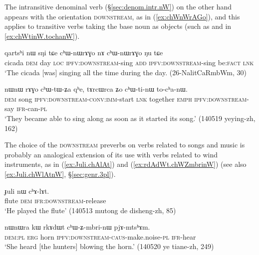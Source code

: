 The intransitive denominal verb  (§\ref{sec:denom.intr.nW}) on the other hand appears with the orientation \textsc{downstream}, as in (\ref{ex:chWnWrAGo}), and this applies to transitive verbs taking the base noun  as objects (such as  and   in \ref{ex:chWtinW.tochanW}).

\begin{exe}
\ex \label{ex:chWnWrAGo}
\gll qartsʰi nɯ sŋi tɕe cʰɯ-nɯrɤɣo nɤ cʰɯ-nɯrɤɣo ŋu tɕe   \\
cicada \textsc{dem} day \textsc{loc} \textsc{ipfv}:\textsc{downstream}-sing \textsc{add} \textsc{ipfv}:\textsc{downstream}-sing be:\textsc{fact} \textsc{lnk} \\
\glt `The cicada [was] singing all the time during the day. (26-NalitCaRmbWm, 30)
\end{exe} 

\begin{exe}
\ex \label{ex:chWtinW.tochanW}
\gll  nɯnɯ rɤɣo cʰɯ-tɯ-ʑa qʰe, tɤrcɯrca ʑo cʰɯ-ti-nɯ to-cʰa-nɯ. \\
\textsc{dem} song \textsc{ipfv}:\textsc{downstream}-\textsc{conv}:\textsc{imm}-start \textsc{lnk} together \textsc{emph} \textsc{ipfv}:\textsc{downstream}-say \textsc{ifr}-can-\textsc{pl} \\
\glt `They became able to sing along as soon as it started its song.'  (140519 yeying-zh, 162)
\end{exe} 

The  choice of the \textsc{downstream} preverbs on verbs related to songs and music is probably an analogical extension of its use with verbs related to wind instruments, as in (\ref{ex:Juli.chAlAt}) and (\ref{ex:rdAdWt.chWZmbrinW}) (see also \ref{ex:Juli.chWlAtnW}, §\ref{sec:genr.3pl}).

\begin{exe}
\ex \label{ex:Juli.chAlAt}
\gll  ɟuli nɯ cʰɤ-lɤt. \\
flute \textsc{dem} \textsc{ifr}:\textsc{downstream}-release \\
\glt `He played the flute' (140513 mutong de disheng-zh, 85)
\end{exe}

\begin{exe}
\ex \label{ex:rdAdWt.chWZmbrinW}
\gll  nɯnɯra kɯ rkɤdɯt cʰɯ-ʑ-mbri-nɯ pjɤ-mtsʰɤm. \\
\textsc{dem}:\textsc{pl} \textsc{erg} horn \textsc{ipfv}:\textsc{downstream}-\textsc{caus}-make.noise-\textsc{pl} \textsc{ifr}-hear \\
\glt `She heard [the hunters] blowing the horn.' (140520 ye tiane-zh, 249)
\end{exe}

